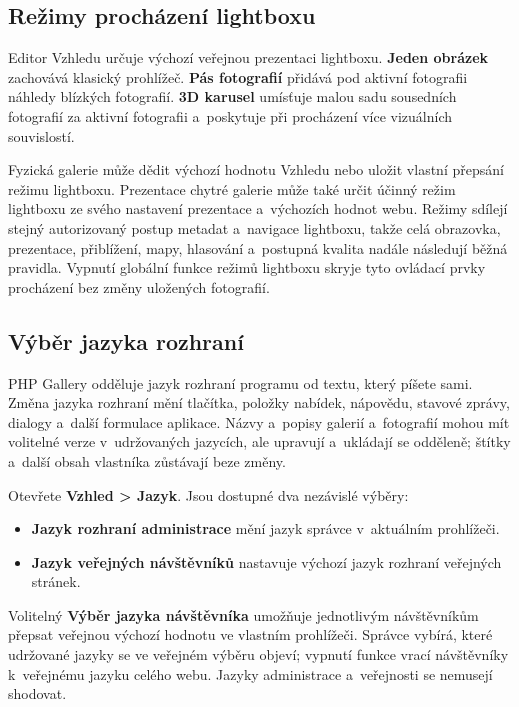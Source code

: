 \documentclass[11pt,a4paper]{article}
\newcommand{\ui}[1]{\textbf{#1}}
\begin{document}
\subsection{Režimy procházení lightboxu}

Editor Vzhledu určuje výchozí veřejnou prezentaci lightboxu. \ui{Jeden obrázek}
zachovává klasický prohlížeč. \ui{Pás fotografií} přidává pod aktivní fotografii
náhledy blízkých fotografií. \ui{3D karusel} umísťuje malou sadu sousedních
fotografií za aktivní fotografii a~poskytuje při procházení více vizuálních
souvislostí.

Fyzická galerie může dědit výchozí hodnotu Vzhledu nebo uložit vlastní přepsání
režimu lightboxu. Prezentace chytré galerie může také určit účinný režim
lightboxu ze svého nastavení prezentace a~výchozích hodnot webu. Režimy sdílejí
stejný autorizovaný postup metadat a~navigace lightboxu, takže celá obrazovka,
prezentace, přiblížení, mapy, hlasování a~postupná kvalita nadále následují
běžná pravidla. Vypnutí globální funkce režimů lightboxu skryje tyto ovládací
prvky procházení bez změny uložených fotografií.

\subsection{Výběr jazyka rozhraní}
\label{sec:language-selection}

PHP Gallery odděluje jazyk rozhraní programu od textu, který píšete sami. Změna
jazyka rozhraní mění tlačítka, položky nabídek, nápovědu, stavové zprávy,
dialogy a~další formulace aplikace. Názvy a~popisy galerií a~fotografií mohou
mít volitelné verze v~udržovaných jazycích, ale upravují a~ukládají se odděleně;
štítky a~další obsah vlastníka zůstávají beze změny.

Otevřete \ui{Vzhled > Jazyk}. Jsou dostupné dva nezávislé výběry:

\begin{itemize}
  \item \ui{Jazyk rozhraní administrace} mění jazyk správce v~aktuálním
  prohlížeči.
  \item \ui{Jazyk veřejných návštěvníků} nastavuje výchozí jazyk rozhraní
  veřejných stránek.
\end{itemize}

Volitelný \ui{Výběr jazyka návštěvníka} umožňuje jednotlivým návštěvníkům
přepsat veřejnou výchozí hodnotu ve vlastním prohlížeči. Správce vybírá, které
udržované jazyky se ve veřejném výběru objeví; vypnutí funkce vrací návštěvníky
k~veřejnému jazyku celého webu. Jazyky administrace a~veřejnosti se nemusejí
shodovat.
\end{document}
